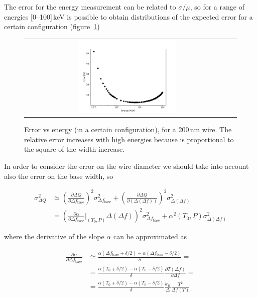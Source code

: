 \documentclass[a4paper,12pt]{article}
\begin{document}
The error for the energy measurement can be related to $\sigma/\mu$, so for a range of energies [0--100]\,keV is possible to obtain distributions of the expected error for a certain configuration (figure~\ref{fig:error})

\begin{figure}[!ht]
  \begin{center}
    \begin{tabular}{cc}
    \includegraphics[width=0.49\textwidth]{error_200nm}
    \end{tabular}
    \caption{Error vs energy (in a certain configuration), for a 200\,nm wire. The relative error increases with high energies because is proportional to the square of the width increase.}
    \label{fig:error}
  \end{center}
\end{figure}

In order to consider the error on the wire diameter we should take into account also the error on the base width, so

\begin{align}
  \sigma_{\Delta Q}^2 & \simeq \left( \frac{\partial \Delta Q}{\partial \Delta f_\mathrm{base}} \right)^2 \sigma_{\Delta f_\mathrm{base}}^2 
                             + \left( \frac{\partial \Delta Q}{\partial(\Delta(\Delta f))} \right)^2 \sigma_{\Delta (\Delta f)}^2  \\
                      & = \left( \frac{\partial \alpha}{\partial \Delta f_\mathrm{base}} \biggr\rvert_{(T_0,P)} \Delta(\Delta f )\right)^2 \sigma_{\Delta f_\mathrm{base}}^2
                        + \alpha^2(T_0,P) \sigma_{\Delta (\Delta f)}^2
\end{align}

where the derivative of the slope $\alpha$ can be approximated as

\begin{align}
  \frac{\partial \alpha}{\partial \Delta f_\mathrm{base}} & \simeq
  \frac{\alpha(\Delta f_\mathrm{base}+\delta/2) - \alpha(\Delta f_\mathrm{base}-\delta/2) }{\delta} = \\
       & = \frac{\alpha(T_0+\delta/2) - \alpha(T_0-\delta/2) }{\delta} \frac{\partial T(\Delta f)}{\partial \Delta f} = \\
       & = \frac{\alpha(T_0+\delta/2) - \alpha(T_0-\delta/2) }{\delta} \frac{k_B}{\varDelta} \frac{T^2}{\Delta f(T)}
\end{align}
\end{document}
